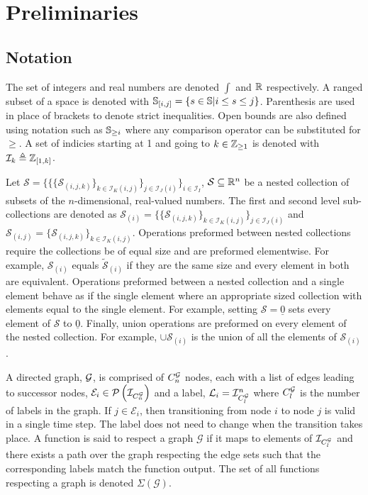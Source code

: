\section{Preliminaries}
\subsection{Notation}
The set of integers and real numbers are denoted $\int$ and $\mathbb{R}$ respectively. A ranged subset of a space is denoted with $\mathbb{S}_{[i,j]}=\{s\in\mathbb{S}|i\leq s\leq j\}$. Parenthesis are used in place of brackets to denote strict inequalities. Open bounds are also defined using notation such as $\mathbb{S}_{\geq i}$ where any comparison operator can be substituted for $\geq$. A set of indicies starting at 1 and going to $k\in\mathbb{Z}_{\geq 1}$ is denoted with $\mathcal{I}_{k}\triangleq\mathbb{Z}_{[1,k]}$. 

Let $\mathcal{S}=\{\{\{\mathcal{S}_{(i,j,k)}\}_{k\in\mathcal{I}_{K}(i,j)}\}_{j\in\mathcal{I}_{J}(i)}\}_{i\in\mathcal{I}_I}$, $\mathcal{S}\subseteq\mathbb{R}^n$ be a nested collection of subsets of the $n$-dimensional, real-valued numbers. The first and second level sub-collections are denoted as $\mathcal{S}_{(i)}=\{\{\mathcal{S}_{(i,j,k)}\}_{k\in\mathcal{I}_{K}(i,j)}\}_{j\in\mathcal{I}_{J}(i)}$ and $\mathcal{S}_{(i,j)}=\{\mathcal{S}_{(i,j,k)}\}_{k\in\mathcal{I}_{K}(i,j)}$. Operations preformed between nested collections require the collections be of equal size and are preformed elementwise. For example, $\mathcal{S}_{(i)}$ equals $\tilde{\mathcal{S}}_{(i)}$ if they are the same size and every element in both are equivalent. Operations preformed between a nested collection and a single element behave as if the single element where an appropriate sized collection with elements equal to the single element. For example, setting $\mathcal{S}=\underline{0}$ sets every element of $\mathcal{S}$ to $\underline{0}$. Finally, union operations are preformed on every element of the nested collection. For example, $\cup \mathcal{S}_{(i)}$ is the union of all the elements of $\mathcal{S}_{(i)}$.

A directed graph, $\mathcal{G}$, is comprised of $C_n^{\mathcal{G}}$ nodes, each with a list of edges leading to successor nodes, $\mathcal{E}_{i}\in\mathcal{P}\left(\mathcal{I}_{C_n^{\mathcal{G}}}\right)$ and a label, $\mathcal{L}_{i}=\mathcal{I}_{C_l^{\mathcal{G}}}^n$ where $C_l^{\mathcal{G}}$ is the number of labels in the graph. If $j\in\mathcal{E}_i$, then transitioning from node $i$ to node $j$ is valid in a single time step. The label does not need to change when the transition takes place. A function is said to respect a graph $\mathcal{G}$ if it maps to elements of $\mathcal{I}_{C_l^{\mathcal{G}}}$ and there exists a path over the graph respecting the edge sets such that the corresponding labels match the function output. The set of all functions respecting a graph is denoted $\Sigma(\mathcal{G})$. 

